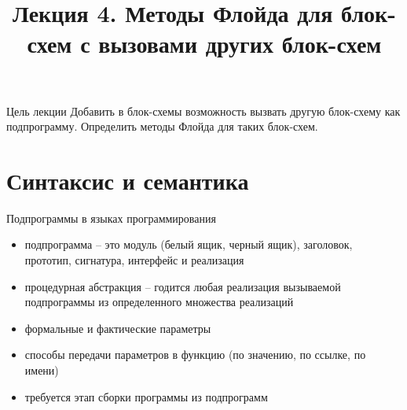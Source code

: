 \documentclass[hyperref={unicode=true}]{beamer}
\title{Лекция 4. Методы Флойда для блок-схем с вызовами других блок-схем}
\author{}
\date{}
\begin{document}
	\begin{frame}{}
		\titlepage
	\end{frame}

    \begin{frame}{Цель лекции}
    Добавить в блок-схемы возможность вызвать
    другую блок-схему как подпрограмму.
    Определить методы Флойда для таких блок-схем.
    \end{frame}

    \section{Синтаксис и семантика}

    \begin{frame}{Подпрограммы в языках программирования}
    \begin{itemize}
    \item подпрограмма -- это модуль (белый ящик, черный ящик),
            заголовок, прототип, сигнатура, интерфейс и реализация
    \item процедурная абстракция -- годится любая реализация
            вызываемой подпрограммы
            из определенного множества реализаций
    \item формальные и фактические параметры
    \item способы передачи параметров в функцию (по значению,
            по ссылке, по имени)
    \item требуется этап сборки программы из подпрограмм
    \end{itemize}
    \end{frame}
\end{document}
